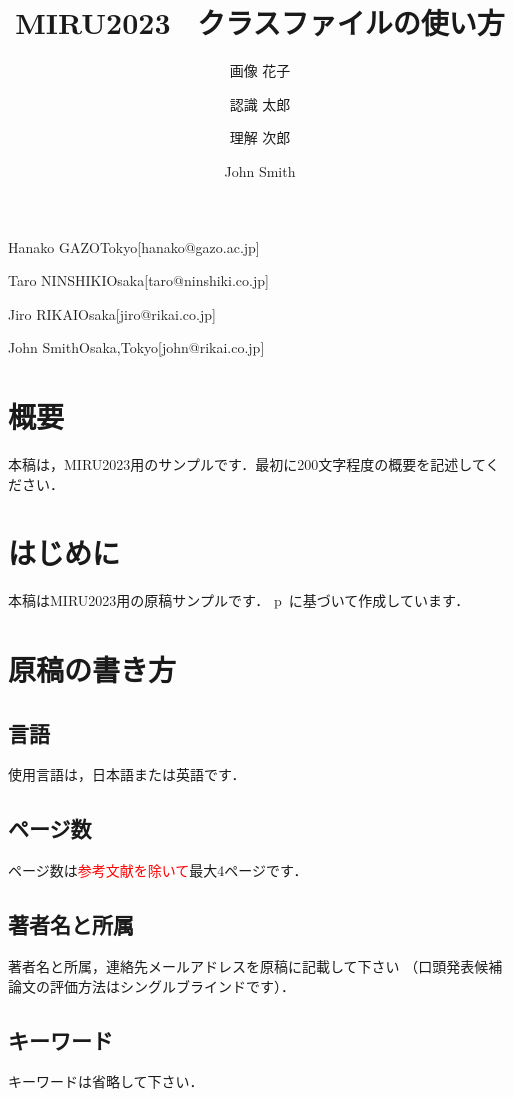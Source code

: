\documentclass[MIRU,submit,uplatex]{miru2023j}
\begin{document}
\title{MIRU2023 \LaTeXe\ クラスファイルの使い方}


 \author{画像 花子}{Hanako GAZO}{Tokyo}[hanako@gazo.ac.jp]
 \author{認識 太郎}{Taro NINSHIKI}{Osaka}[taro@ninshiki.co.jp]
 \author{理解 次郎}{Jiro RIKAI}{Osaka}[jiro@rikai.co.jp]
 \author{John Smith}{John Smith}{Osaka,Tokyo}[john@rikai.co.jp]


\maketitle

\section*{概要}
本稿は，MIRU2023用のサンプルです．最初に200文字程度の概要を記述してください．

\section{はじめに}
本稿はMIRU2023用の原稿サンプルです．
p\LaTeXe\ に基づいて作成しています．

\section{原稿の書き方}

\subsection{言語}
使用言語は，日本語または英語です．

\subsection{ページ数}
ページ数は\textcolor{red}{参考文献を除いて}最大4ページです．

\subsection{著者名と所属}
著者名と所属，連絡先メールアドレスを原稿に記載して下さい
（口頭発表候補論文の評価方法はシングルブラインドです）．

\subsection{キーワード}
キーワードは省略して下さい．
\end{document}
